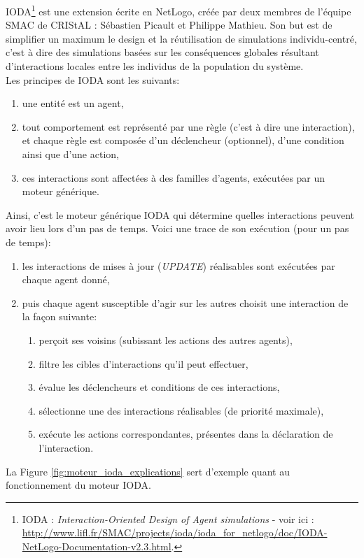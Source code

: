 IODA\footnote{IODA : \textit{Interaction-Oriented Design of Agent simulations}\nocite{IODAManuel}\nocite{jaamas2011-ioda} - voir ici : \url{http://www.lifl.fr/SMAC/projects/ioda/ioda_for_netlogo/doc/IODA-NetLogo-Documentation-v2.3.html}.} est une extension écrite en NetLogo, créée par deux membres de l'équipe SMAC de CRIStAL : Sébastien Picault et Philippe Mathieu. Son but est de simplifier un maximum le design et la réutilisation de simulations individu-centré, c'est à dire des simulations basées sur les conséquences globales résultant d'interactions locales entre les individus de la population du système.
\\
Les principes de IODA sont les suivants:
\begin{enumerate}
\item{une entité est un agent,}
\item{tout comportement est représenté par une règle (c'est à dire une interaction), et chaque règle est composée d'un déclencheur (optionnel), d'une condition ainsi que d'une action,}
\item{ces interactions sont affectées à des familles d'agents, exécutées par un moteur générique.}
\end{enumerate}
Ainsi, c'est le moteur générique IODA qui détermine quelles interactions peuvent avoir lieu lors d'un pas de temps. Voici une trace de son exécution (pour un pas de temps):
\begin{enumerate}
\item{les interactions de mises à jour (\textit{UPDATE}) réalisables sont exécutées par chaque agent donné,}
\item{puis chaque agent susceptible d'agir sur les autres choisit une interaction de la façon suivante:
\begin{enumerate}
\item{perçoit ses voisins (subissant les actions des autres agents),}
\item{filtre les cibles d'interactions qu'il peut effectuer,}
\item{évalue les déclencheurs et conditions de ces interactions,}
\item{sélectionne une des interactions réalisables (de priorité maximale),}
\item{exécute les actions correspondantes, présentes dans la déclaration de l'interaction.}
\end{enumerate}
}
\end{enumerate}

La Figure \ref{fig:moteur_ioda_explications} sert d'exemple quant au fonctionnement du moteur IODA.

